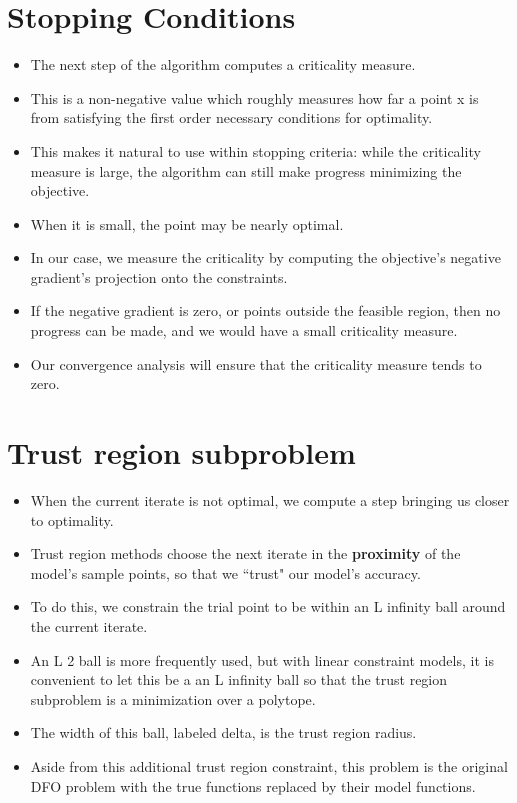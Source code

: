 \documentclass{article}
\begin{document}
	\section{Stopping Conditions}
\begin{itemize}
\item The next step of the algorithm computes a criticality measure.
\item This is a non-negative value which roughly measures how far a point x is from satisfying the first order necessary conditions for optimality.
\item This makes it natural to use within stopping criteria: while the criticality measure is large, the algorithm can still make progress minimizing the objective.
\item When it is small, the point may be nearly optimal.
\item In our case, we measure the criticality by computing the objective's negative gradient's projection onto the constraints.
\item If the negative gradient is zero, or points outside the feasible region, then no progress can be made, and we would have a small criticality measure.
\item Our convergence analysis will ensure that the criticality measure tends to zero.
\end{itemize}


	\section{Trust region subproblem}
\begin{itemize}
\item When the current iterate is not optimal, we compute a step bringing us closer to optimality.
\item Trust region methods choose the next iterate in the \textbf{proximity} of the model's sample points, so that we ``trust" our model's accuracy.
\item To do this, we constrain the trial point to be within an L infinity ball around the current iterate.
\item An L 2 ball is more frequently used, but with linear constraint models, it is convenient to let this be a an L infinity ball so that the trust region subproblem is a minimization over a polytope.
\item The width of this ball, labeled delta, is the trust region radius.
\item Aside from this additional trust region constraint, this problem is the original DFO problem with the true functions replaced by their model functions.
\end{itemize}
\end{document}

